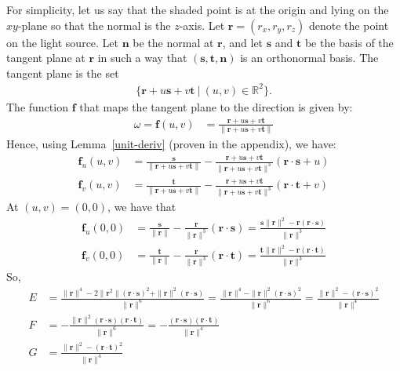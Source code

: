 \documentclass[10pt]{article}
\newcommand{\ve}[1]{\mathbf{#1}}
\newcommand{\Real}{\mathbb{R}}
\begin{document}
  For simplicity, let us say that the shaded point is at the origin and lying on the $xy$-plane so that the normal is the $z$-axis.  Let $\ve{r} = (r_x, r_y, r_z)$ denote the point on the light source.  Let $\ve{n}$ be the normal at $\ve{r}$, and let $\ve{s}$ and $\ve{t}$ be the basis of the tangent plane at $\ve{r}$ in such a way that $(\ve{s}, \ve{t}, \ve{n})$ is an orthonormal basis.  The tangent plane is the set
  \begin{align*}
    \{ \ve{r} + u \ve{s} + v \ve{t}\ |\ (u, v) \in \Real^2 \}.
  \end{align*}
  The function $\ve{f}$ that maps the tangent plane to the direction is given by:
  \begin{align*}
    \omega 
    = \ve{f}(u,v) 
    &= \frac{\ve{r} + u \ve{s} + v \ve{t}}{\| \ve{r} + u \ve{s} + v \ve{t} \|} 
  \end{align*}  
  Hence, using Lemma~\ref{unit-deriv} (proven in the appendix), we have:
  \begin{align*}
    \ve{f}_u(u,v) &= \frac{\ve{s}}{\| \ve{r} + u \ve{s} + v \ve{t} \|} - \frac{\ve{r} + u \ve{s} + v \ve{t}}{\| \ve{r} + u \ve{s} + v \ve{t} \|^3 } (\ve{r} \cdot \ve{s} + u) \\
    \ve{f}_v(u,v) &= \frac{\ve{t}}{\| \ve{r} + u \ve{s} + v \ve{t} \|} - \frac{\ve{r} + u \ve{s} + v \ve{t}}{\| \ve{r} + u \ve{s} + v \ve{t} \|^3 } (\ve{r} \cdot \ve{t} + v)
  \end{align*}
  At $(u,v) = (0,0)$, we have that
  \begin{align*}
    \ve{f}_u(0,0) 
    &= \frac{\ve{s}}{\| \ve{r} \|} - \frac{\ve{r}}{\| \ve{r}\|^3 } (\ve{r} \cdot \ve{s}) 
    = \frac{\ve{s}\| \ve{r} \|^2 - \ve{r}(\ve{r}\cdot \ve{s})}{\| \ve{r} \|^3}\\
    \ve{f}_v(0,0) 
    &= \frac{\ve{t}}{\| \ve{r} \|} - \frac{\ve{r}}{\| \ve{r}\|^3 } (\ve{r} \cdot \ve{t})
    = \frac{\ve{t}\| \ve{r} \|^2 - \ve{r}(\ve{r}\cdot \ve{t})}{\| \ve{r} \|^3}
  \end{align*}
  So,
  \begin{align*}
    E 
    &= \frac{\| \ve{r} \|^4 - 2\| \ve{r}^2 \|(\ve{r} \cdot \ve{s})^2 + \| \ve{r} \|^2 (\ve{r} \cdot \ve{s}) }{\| \ve{r} \|^6}
    = \frac{\| \ve{r} \|^4 - \| \ve{r} \|^2 (\ve{r}\cdot\ve{s})^2 }{\| \ve{r} \|^6}
    = \frac{\| \ve{r}\|^2 - (\ve{r} \cdot \ve{s} )^2}{\| \ve{r} \|^4} \\
    F 
    &= -\frac{\| \ve{r} \|^2 (\ve{r}\cdot \ve{s})(\ve{r} \cdot \ve{t}) }{\| \ve{r} \|^6}
    = - \frac{(\ve{r} \cdot \ve{s})(\ve{r} \cdot \ve{t})}{\| \ve{r} \|^4} \\
    G 
    &= \frac{\| \ve{r}\|^2 - (\ve{r} \cdot \ve{t} )^2}{\| \ve{r} \|^4}
  \end{align*}
\end{document}
